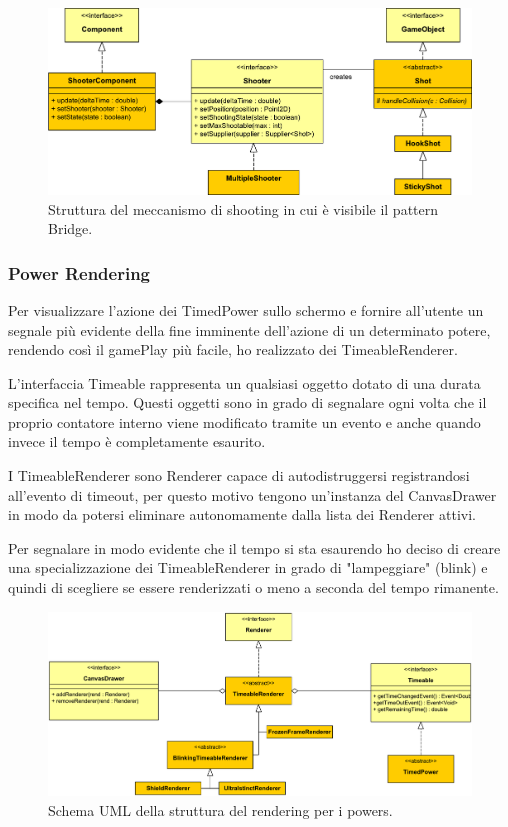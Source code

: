 \documentclass[a4paper,12pt]{report}
\begin{document}
\begin{figure}[H]
\includegraphics[width=\linewidth]{img/shooter}
\caption{Struttura del meccanismo di shooting in cui è visibile il pattern Bridge.}
\label{img:shooter}
\end{figure}

\subsubsection*{Power Rendering}

Per visualizzare l'azione dei TimedPower sullo schermo e fornire all'utente un segnale più evidente della fine imminente dell'azione di un determinato potere, rendendo così il gamePlay più facile, ho realizzato dei TimeableRenderer.

L'interfaccia Timeable rappresenta un qualsiasi oggetto dotato di una durata specifica nel tempo.
Questi oggetti sono in grado di segnalare ogni volta che il proprio contatore interno viene modificato tramite un evento e anche quando invece il tempo è completamente esaurito. 

I TimeableRenderer sono Renderer capace di autodistruggersi registrandosi all'evento di timeout, per questo motivo tengono un'instanza del CanvasDrawer in modo da potersi eliminare autonomamente dalla lista dei Renderer attivi. 

Per segnalare in modo evidente che il tempo si sta esaurendo ho deciso di creare una specializzazione dei TimeableRenderer in grado di "lampeggiare" (blink) e quindi di scegliere se essere renderizzati o meno a seconda del tempo rimanente.

\begin{figure}[H]
\includegraphics[width=\linewidth]{img/power_rendering}
\caption{Schema UML della struttura del rendering per i powers.}
\label{img:power_rendering}
\end{figure}
\end{document}
